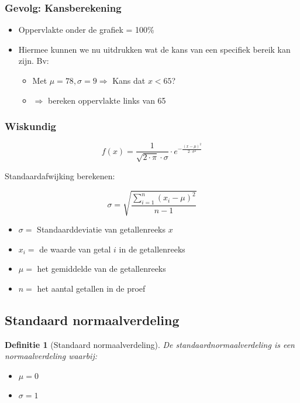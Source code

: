 \documentclass{article}
\newtheorem{theorem}{Definitie}[section]
\begin{document}
\subsubsection{Gevolg: Kansberekening}

\begin{itemize}
    \item Oppervlakte onder de grafiek = 100\%
    \item Hiermee kunnen we nu uitdrukken wat de kans van een specifiek bereik kan zijn. Bv:
    \begin{itemize}
        \item Met $\mu = 78, \sigma = 9 \Rightarrow $ Kans dat $x < 65$? 
        \item $\Rightarrow$ bereken oppervlakte links van 65
    \end{itemize}
\end{itemize}

\subsubsection{Wiskundig}

\begin{equation}
f(x) = \frac{1}{\sqrt{2\cdot\pi}\cdot \sigma}\cdot e^{-\frac{(x - \mu)^2}{2\cdot\sigma^2}}
\end{equation}

Standaardafwijking berekenen:

\begin{equation}
    \sigma = \sqrt{\frac{\sum_{i=1}^n (x_i - \mu)^2}{n - 1}}
\end{equation}

\begin{itemize}
    \item $\sigma =$ Standaarddeviatie van getallenreeks $x$
    \item $x_i =$ de waarde van getal $i$ in de getallenreeks
    \item $\mu =$ het gemiddelde van de getallenreeks
    \item $n =$ het aantal getallen in de proef
\end{itemize}

\subsection{Standaard normaalverdeling}

\begin{theorem}[Standaard normaalverdeling]
    De standaardnormaalverdeling is een normaalverdeling waarbij:
    
    \begin{itemize}
        \item $\mu = 0$
        \item $\sigma = 1$
    \end{itemize}
\end{theorem}
\end{document}
